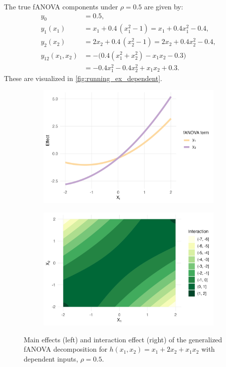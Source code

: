 The true fANOVA components under $\rho = 0.5$ are given by:
\begin{align*}
y_0 &= 0.5, \\[3pt]
y_1(x_1) &= x_1 + 0.4\,(x_1^2 - 1)
        = x_1 + 0.4x_1^2 - 0.4, \\[3pt]
y_2(x_2) &= 2x_2 + 0.4\,(x_2^2 - 1)
        = 2x_2 + 0.4x_2^2 - 0.4, \\[3pt]
y_{12}(x_1,x_2) 
&= -\Big( 0.4(x_1^2 + x_2^2) - x_1 x_2 - 0.3 \Big) \\[3pt]
&= -0.4x_1^2 - 0.4x_2^2 + x_1 x_2 + 0.3.
\end{align*}
These are visualized in \autoref{fig:running_ex_dependent}.
\begin{figure}[htpb]
    \centering
    \begin{subfigure}[t]{0.49\textwidth}
        \centering
        \includegraphics[width=\textwidth]{images/experiment_section/running_example_a1p10_a2p20_a11p00_a22p00_a12p10_rhop05_main.png}
    \end{subfigure}%
    \hfill
    \begin{subfigure}[t]{0.49\textwidth}
        \centering
        \includegraphics[width=\textwidth]{images/experiment_section/running_example_a1p10_a2p20_a11p00_a22p00_a12p10_rhop05_interaction.png}
    \end{subfigure}
    \caption{Main effects (left) and interaction effect (right) of the generalized fANOVA decomposition for $h(x_1, x_2) = x_1 + 2 x_2 + x_1 x_2$ with dependent inputs, $\rho = 0.5$.}
    \label{fig:running_ex_dependent}
\end{figure}
